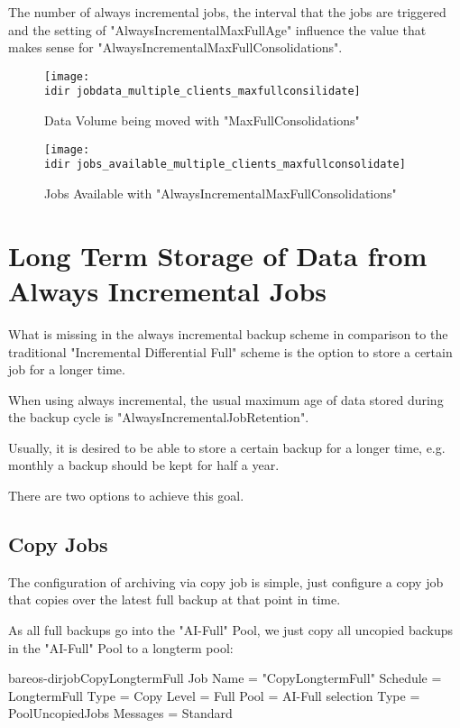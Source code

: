 The number of always incremental jobs, the interval that the jobs are triggered and the setting of "AlwaysIncrementalMaxFullAge" influence the value that makes sense for "AlwaysIncrementalMaxFullConsolidations".

\begin{figure}[htbp]
\centering
\texttt{[image: \\idir jobdata\_multiple\_clients\_maxfullconsilidate]}
\caption{Data Volume being moved with "MaxFullConsolidations"}
\end{figure}%

\begin{figure}[htbp]
\centering
\texttt{[image: \\idir jobs\_available\_multiple\_clients\_maxfullconsolidate]}
\caption{Jobs Available with "AlwaysIncrementalMaxFullConsolidations"}
\end{figure}%


\section{Long Term Storage of Data from Always Incremental Jobs}

What is missing in the always incremental backup scheme in comparison to the traditional "Incremental Differential Full" scheme is the option to store a certain job for a longer time.

When using always incremental, the usual maximum age of data stored during the backup cycle is "AlwaysIncrementalJobRetention".

Usually, it is desired to be able to store a certain backup for a longer time, e.g. monthly a backup should be kept for half a year.


There are two options to achieve this goal.

\subsection{Copy Jobs}

The configuration of archiving via copy job is simple, just configure a copy job that copies over the latest full backup
at that point in time.

As all full backups go into the "AI-Full" Pool, we just copy all uncopied backups in the "AI-Full" Pool to a longterm pool:

\begin{bareosConfigResource}{bareos-dir}{job}{CopyLongtermFull}
Job {
  Name = "CopyLongtermFull"
  Schedule = LongtermFull
  Type = Copy
  Level = Full
  Pool = AI-Full
  selection Type = PoolUncopiedJobs
  Messages = Standard
}
\end{bareosConfigResource}

